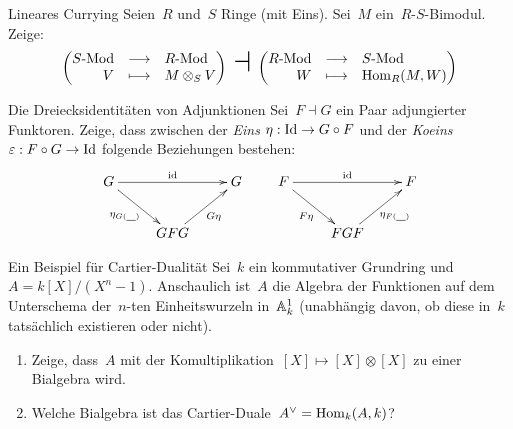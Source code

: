 \documentclass{uebblatt}
\begin{document}
\begin{aufgabe}{Lineares Currying}
Seien~$R$ und~$S$ Ringe (mit Eins).
Sei~$M$ ein~$R$-$S$-Bimodul. Zeige:
\[ \left(\begin{array}{@{}rcl@{}}
  \lMod{S} &\longrightarrow& \lMod{R} \\
  V &\longmapsto& M \otimes_S V
\end{array}\right)\ \text{\huge$\dashv$}\ \left(\begin{array}{@{}rcl@{}}
  \lMod{R} &\longrightarrow& \lMod{S} \\
  W &\longmapsto& \Hom_R(M,W)
\end{array}\right) \]
\vspace{-1em}
\end{aufgabe}

\begin{aufgabe}{Die Dreiecksidentitäten von Adjunktionen}
Sei~$F \dashv G$ ein Paar adjungierter Funktoren. Zeige, dass zwischen
der \emph{Eins} $\eta : \Id \to G \circ F$ und der \emph{Koeins} $\varepsilon :
F \circ G \to \Id$ folgende Beziehungen bestehen:
\[
  \xymatrix{
    G \ar[rd]_{\eta_{G(\smallplaceholder)}} \ar[rr]^{\id} &&
    G \\
    & GFG \ar[ru]_{G \eta}
  }
  \qquad
  \xymatrix{
    F \ar[rd]_{F \eta} \ar[rr]^{\id} &&
    F \\
    & FGF \ar[ru]_{\eta_{F(\smallplaceholder)}}
  }
\]
\vspace{-1em}
\end{aufgabe}

\begin{aufgabe}{Ein Beispiel für Cartier-Dualität}
Sei~$k$ ein kommutativer Grundring und~$A = k[X]/(X^n - 1)$. Anschaulich
ist~$A$ die Algebra der Funktionen auf dem Unterschema der~$n$-ten
Einheitswurzeln in~$\AA^1_k$ (unabhängig davon, ob diese in~$k$ tatsächlich
existieren oder nicht).
\begin{enumerate}
\item Zeige, dass~$A$ mit der Komultiplikation~$[X] \mapsto [X] \otimes [X]$ zu
einer Bialgebra wird.
\item Welche Bialgebra ist das Cartier-Duale~$A^\vee = \Hom_k(A,k)$?
\end{enumerate}
\end{aufgabe}
\end{document}
